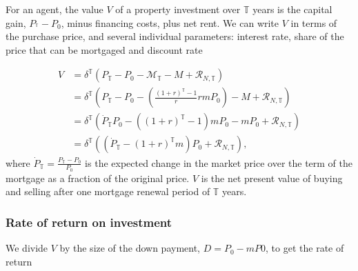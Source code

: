  For an agent, the value $V$ of a property investment over  $\mathbb{T}$ years is the capital gain, $P_{^\mathbb{T}}-P_{0}$, minus financing costs, plus net rent. %
 We can write $V$ in terms of the purchase price, and several individual parameters: interest rate, share of the price that can be mortgaged and discount rate %
 
 \begin{align}
V &= \delta^\mathbb{T}\left( P_\mathbb{T}-P_0-\mathcal{M}_{\mathbb{T}}- M+ \mathcal{R}_{N, \mathbb{T}} \right)      \nonumber\\
&= \delta^\mathbb{T}\left( P_\mathbb{T}-P_0- \left(\frac{(1+r)^\mathbb{T}-1}{r}rmP_0\right)- M+ \mathcal{R}_{N, \mathbb{T}} \right)      \nonumber\\
&= \delta^\mathbb{T} \left(
\dot P_\mathbb{T} P_0 -\left((1+r)^\mathbb{T}-1\right)mP_0-mP_0
 +  \mathcal{R}_{N, \mathbb{T}} \right) 
\\
  &= \delta^\mathbb{T} \left((\dot P_\mathbb{T} - (1+r)^\mathbb{T}m) P_0 + \mathcal{R}_{N, \mathbb{T}}\right),\label{eqn_investment_value}
\end{align}
where $\dot P_\mathbb{T}=\frac{P_\mathbb{T}-P_0 }{P_0}$  is the expected  change in the market price over the term of the mortgage as a fraction of the original price.
$V$ is the net present value of buying and selling after one mortgage renewal period of $\mathbb{T}$ years. %


\subsubsection{Rate of return on investment}
We divide $V$ by the size of the down payment, $D=P_0-mP0$, to get the  rate of return  

